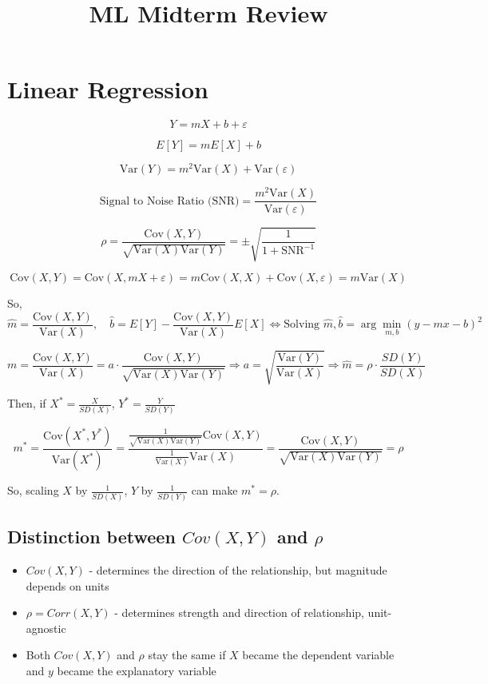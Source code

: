 \documentclass{article}
\title{ML Midterm Review}
\author{}
\date{}
\begin{document}
\maketitle

\section*{Linear Regression}

\[
Y = mX + b + \varepsilon
\]

\[
E[Y] = mE[X] + b
\]

\[
\text{Var}(Y) = m^2 \text{Var}(X) + \text{Var}(\varepsilon)
\]

\[
\text{Signal to Noise Ratio (SNR)} = \frac{m^2 \text{Var}(X)}{\text{Var}(\varepsilon)}
\]

\[
\rho = \frac{\text{Cov}(X, Y)}{\sqrt{\text{Var}(X) \text{Var}(Y)}} = \pm \sqrt{\frac{1}{1 + \text{SNR}^{-1}}}
\]

\[
\text{Cov}(X, Y) = \text{Cov}(X, mX + \varepsilon) = m \text{Cov}(X, X) + \text{Cov}(X, \varepsilon) = m \text{Var}(X)
\]

So,
\[
\boxed{\hat{m} = \frac{\text{Cov}(X, Y)}{\text{Var}(X)}}, \quad \hat{b} = E[Y] - \frac{\text{Cov}(X, Y)}{\text{Var}(X)} E[X] \iff \text{Solving } \hat{m}, \hat{b} = \arg\min_{m, b} (y - mx - b)^2
\]

\[
m = \frac{\text{Cov}(X, Y)}{\text{Var}(X)} = a \cdot \frac{\text{Cov}(X, Y)}{\sqrt{\text{Var}(X) \text{Var}(Y)}} \Rightarrow a = \sqrt{\frac{\text{Var}(Y)}{\text{Var}(X)}} \Rightarrow \hat{m} = \rho \cdot \frac{SD(Y)}{SD(X)}
\]

Then, if $X^* = \frac{X}{SD(X)}$, $Y^* = \frac{Y}{SD(Y)}$

\[
m^* = \frac{\text{Cov}(X^*, Y^*)}{\text{Var}(X^*)} = \frac{\frac{1}{\sqrt{\text{Var}(X) \text{Var}(Y)}} \text{Cov}(X, Y)}{\frac{1}{\text{Var}(X)} \text{Var}(X)} = \frac{\text{Cov}(X, Y)}{\sqrt{\text{Var}(X) \text{Var}(Y)}} = \rho
\]

So, scaling $X$ by $\frac{1}{SD(X)}$, $Y$ by $\frac{1}{SD(Y)}$ can make $m^* = \rho$.

\subsection*{Distinction between $Cov(X,Y)$ and $\rho$}
\begin{itemize}
    \item $Cov(X,Y)$ - determines the direction of the relationship, but magnitude depends on units
    \item $\rho = Corr(X,Y)$ - determines strength and direction of relationship, unit-agnostic
    \item Both $Cov(X,Y)$ and $\rho$ stay the same if $X$ became the dependent variable and $y$ became the explanatory variable
\end{itemize}
\end{document}
